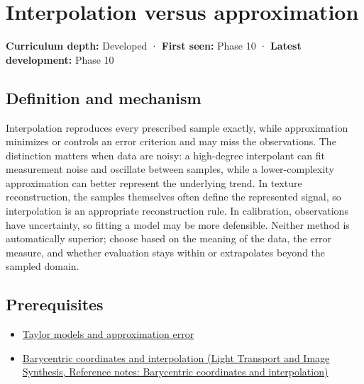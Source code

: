 \hypertarget{appendix-0c2a5f69851e}{}\label{referencestart:appendix-0c2a5f69851e}
\section{Interpolation versus approximation}\label{appendix-0c2a5f69851e-interpolation-versus-approximation}

\textbf{Curriculum depth:} Developed · \textbf{First seen:} Phase 10 · \textbf{Latest development:} Phase 10

\begin{allmightroledefinition}

\subsection{Definition and mechanism}\label{appendix-0c2a5f69851e-definition-and-mechanism}

Interpolation reproduces every prescribed sample exactly, while approximation minimizes or controls an error criterion and may miss the observations. The distinction matters when data are noisy: a high-degree interpolant can fit measurement noise and oscillate between samples, while a lower-complexity approximation can better represent the underlying trend. In texture reconstruction, the samples themselves often define the represented signal, so interpolation is an appropriate reconstruction rule. In calibration, observations have uncertainty, so fitting a model may be more defensible. Neither method is automatically superior; choose based on the meaning of the data, the error measure, and whether evaluation stays within or extrapolates beyond the sampled domain.

\end{allmightroledefinition}

\subsection{Prerequisites}\label{appendix-0c2a5f69851e-prerequisites}

\begin{itemize}
\tightlist
\item
  \hyperref[appendix-32f39e9a3738]{Taylor models and approximation error}
\item
  \href{../04-Light-Transport-and-Image-Synthesis/main.pdf\#nameddest=appendix-02b9d9a81dca}{Barycentric coordinates and interpolation (Light Transport and Image Synthesis, Reference notes: Barycentric coordinates and interpolation)}
\end{itemize}


